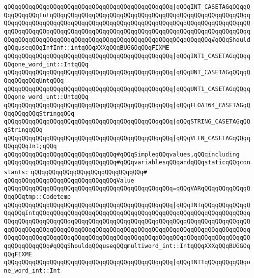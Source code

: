 \verb|qQQqqQQqqQQqqQQqqQQqqQQqqQQqqQQqqQQqqQQqqQQqqQQq|\verb#|qQQqINT_CASETAGqQQqqQQqqQQqqQQqIntqQQqqQQqqQQqqQQqqQQqqQQqqQQqqQQqqQQqqQQqqQQqqQQqqQQqqQQqqQQqqQQqqQQqqQQqqQQqqQQqqQQqqQQqqQQqqQQqqQQqqQQqqQQqqQQqqQQqqQQqqQQqqQQqqQQqqQQqqQQqqQQqqQQqqQQqqQQqqQQqqQQqqQQqqQQqqQQqqQQqqQQqqQQqqQQqqQQqqQQqqQQqqQQqqQQqqQQqqQQqqQQqqQQqqQQqqQQqqQQqqQQqqQQqqQQqqQQq#\verb|#qQQqShouldqQQquseqQQqInfInf::intqQQqXXXqQQqBUGGOqQQqFIXME|\newline
\verb|qQQqqQQqqQQqqQQqqQQqqQQqqQQqqQQqqQQqqQQqqQQqqQQq|\verb#|qQQqINT1_CASETAGqQQqqQQqone_word_int::IntqQQq#\newline
\verb|qQQqqQQqqQQqqQQqqQQqqQQqqQQqqQQqqQQqqQQqqQQqqQQq|\verb#|qQQqUNT_CASETAGqQQqqQQqqQQqqQQqUntqQQq#\newline
\verb|qQQqqQQqqQQqqQQqqQQqqQQqqQQqqQQqqQQqqQQqqQQqqQQq|\verb#|qQQqUNT1_CASETAGqQQqqQQqone_word_unt::UntqQQq#\newline
\verb|qQQqqQQqqQQqqQQqqQQqqQQqqQQqqQQqqQQqqQQqqQQqqQQq|\verb#|qQQqFLOAT64_CASETAGqQQqqQQqqQQqStringqQQq#\newline
\verb|qQQqqQQqqQQqqQQqqQQqqQQqqQQqqQQqqQQqqQQqqQQqqQQq|\verb#|qQQqSTRING_CASETAGqQQqStringqQQq#\newline
\verb|qQQqqQQqqQQqqQQqqQQqqQQqqQQqqQQqqQQqqQQqqQQqqQQq|\verb#|qQQqVLEN_CASETAGqQQqqQQqqQQqInt;qQQq#\newline
\newline
\verb|qQQqqQQqqQQqqQQqqQQqqQQqqQQqqQQq#qQQqSimpleqQQqvalues,qQQqincluding|\newline
\verb|qQQqqQQqqQQqqQQqqQQqqQQqqQQqqQQq#qQQqvariablesqQQqandqQQqstaticqQQqconstants:|\newline
\verb|qQQqqQQqqQQqqQQqqQQqqQQqqQQqqQQq#|\newline
\verb|qQQqqQQqqQQqqQQqqQQqqQQqqQQqqQQqValue|\newline
\verb|qQQqqQQqqQQqqQQqqQQqqQQqqQQqqQQqqQQqqQQqqQQqqQQq=qQQqVARqQQqqQQqqQQqqQQqqQQqtmp::Codetemp|\newline
\verb|qQQqqQQqqQQqqQQqqQQqqQQqqQQqqQQqqQQqqQQqqQQqqQQq|\verb#|qQQqINTqQQqqQQqqQQqqQQqqQQqIntqQQqqQQqqQQqqQQqqQQqqQQqqQQqqQQqqQQqqQQqqQQqqQQqqQQqqQQqqQQqqQQqqQQqqQQqqQQqqQQqqQQqqQQqqQQqqQQqqQQqqQQqqQQqqQQqqQQqqQQqqQQqqQQqqQQqqQQqqQQqqQQqqQQqqQQqqQQqqQQqqQQqqQQqqQQqqQQqqQQqqQQqqQQqqQQqqQQqqQQqqQQqqQQqqQQqqQQqqQQqqQQqqQQqqQQqqQQqqQQqqQQqqQQqqQQqqQQqqQQqqQQqqQQqqQQqqQQqqQQqqQQq#\verb|#qQQqShouldqQQquseqQQqmultiword_int::IntqQQqXXXqQQqBUGGOqQQqFIXME|\newline
\verb|qQQqqQQqqQQqqQQqqQQqqQQqqQQqqQQqqQQqqQQqqQQqqQQq|\verb#|qQQqINT1qQQqqQQqqQQqone_word_int::Int#\newline
